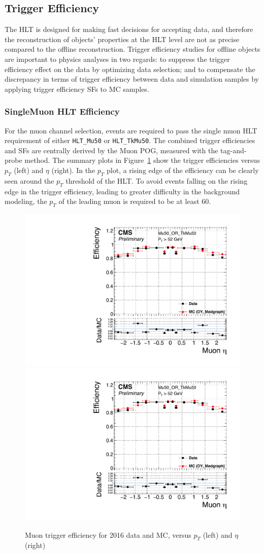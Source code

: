 \subsection{Trigger Efficiency}\label{sec:bkg_trig}
The HLT is designed for making fast decisions for accepting data, and therefore the reconstruction of objects' properties at the HLT level are not as precise compared to the offline reconstruction. Trigger efficiency studies for offline objects are important to physics analyses in two regards: to suppress the trigger efficiency effect on the data by optimizing data selection; and to compensate the discrepancy in terms of trigger efficiency between data and simulation samples by applying trigger efficiency SFs to MC samples.
\subsubsection{SingleMuon HLT Efficiency}
For the muon channel selection, events are required to pass the single muon HLT requirement of either \texttt{HLT\_Mu50} or \texttt{HLT\_TkMu50}. The combined trigger efficiencies and SFs are centrally derived by the Muon POG, measured with the tag-and-probe method. The summary plots in Figure~\ref{fig:bg_trgeff_mu} show the trigger efficiencies versus $p_T$ (left) and $\eta$ (right). In the $p_T$ plot, a rising edge of the efficiency can be clearly seen around the $p_T$ threshold of the HLT. To avoid events falling on the rising edge in the trigger efficiency, leading to greater difficulty in the background modeling, the $p_T$ of the leading muon is required to be at least 60\GeV.

\begin{figure}[htpb]
\begin{center}
\includegraphics[width=0.49\linewidth, page=2]{figures/bg_muontrgeff.pdf}
\includegraphics[width=0.49\linewidth, page=1]{figures/bg_muontrgeff.pdf}
\caption{Muon trigger efficiency for 2016 data and MC, versus $p_T$ (left) and $\eta$ (right)}
\label{fig:bg_trgeff_mu}
\end{center}
\end{figure}

